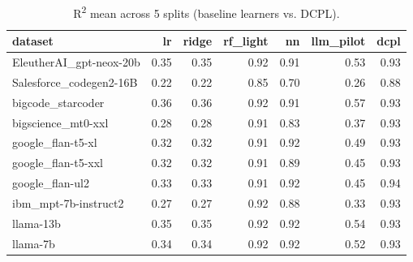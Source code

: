 \begin{table}
\caption{R\textsuperscript{2} mean across 5 splits (baseline learners vs. DCPL).}
\label{tab:r2_mean_baseline_vs_dcpl}
\begin{tabular}{lrrrrrr}
\toprule
dataset & lr & ridge & rf\_light & nn & llm\_pilot & dcpl \\
\midrule
EleutherAI\_gpt-neox-20b & 0.35 & 0.35 & 0.92 & 0.91 & 0.53 & 0.93 \\
Salesforce\_codegen2-16B & 0.22 & 0.22 & 0.85 & 0.70 & 0.26 & 0.88 \\
bigcode\_starcoder & 0.36 & 0.36 & 0.92 & 0.91 & 0.57 & 0.93 \\
bigscience\_mt0-xxl & 0.28 & 0.28 & 0.91 & 0.83 & 0.37 & 0.93 \\
google\_flan-t5-xl & 0.32 & 0.32 & 0.91 & 0.92 & 0.49 & 0.93 \\
google\_flan-t5-xxl & 0.32 & 0.32 & 0.91 & 0.89 & 0.45 & 0.93 \\
google\_flan-ul2 & 0.33 & 0.33 & 0.91 & 0.92 & 0.45 & 0.94 \\
ibm\_mpt-7b-instruct2 & 0.27 & 0.27 & 0.92 & 0.88 & 0.33 & 0.93 \\
llama-13b & 0.35 & 0.35 & 0.92 & 0.92 & 0.54 & 0.93 \\
llama-7b & 0.34 & 0.34 & 0.92 & 0.92 & 0.52 & 0.93 \\
\bottomrule
\end{tabular}
\end{table}
